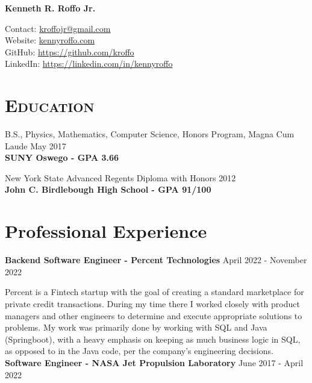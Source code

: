\documentclass[8pt]{article}
\def\name{Kenneth R. Roffo Jr.}
\renewenvironment{itemize}{
  \begin{list}{}{
    \setlength{\leftmargin}{1.5em}
  }
}{
  \end{list}
}
\begin{document}
{\huge \bf \name}


Contact: \href{mailto:kroffojr@gmail.com}{kroffojr@gmail.com}\\
Website: \href{http://kennyroffo.com}{kennyroffo.com}\\
GitHub: \href{https://github.com/kroffo}{https://github.com/kroffo}\\
LinkedIn: \href{https://www.linkedin.com/in/kennyroffo}{https://linkedin.com/in/kennyroffo}

\section*{\textsc{Education}}

\begin{itemize}
  \item B.S., Physics, Mathematics, Computer Science, Honors Program, Magna Cum Laude \hfill May 2017\\
  \textbf{SUNY Oswego - GPA 3.66}
  \item New York State Advanced Regents Diploma with Honors \hfill 2012\\
  \textbf{John C. Birdlebough High School - GPA 91/100}
  \end{itemize}


\section*{Professional Experience}
\textbf{Backend Software Engineer - Percent Technologies} \hfill April 2022 - November 2022

Percent is a Fintech startup with the goal of creating a standard marketplace for private credit transactions. During my time there I worked closely with product managers and other engineers to determine and execute appropriate solutions to problems. My work was primarily done by working with SQL and Java (Springboot), with a heavy emphasis on keeping as much business logic in SQL, as opposed to in the Java code, per the company's engineering decisions.\\

\textbf{Software Engineer - NASA Jet Propulsion Laboratory} \hfill June 2017 - April 2022
\end{document}
